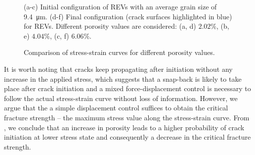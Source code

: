 \begin{figure}[!htb]
\begin{subfigure}{0.32\textwidth}
    \caption{}
    \label{b150_end}
  \end{subfigure}
  \caption{ (a-c) Initial configuration of REVs with an average grain size of \SI{9.4}{\micro\meter}. (d-f) Final configuration (crack surfaces highlighted in blue) for REVs. Different porosity values are considered: (a, d) $2.02\%$, (b, e) $4.04\%$, (c, f) $6.06\%$. }
  \label{ini_final_porosity}
\end{figure}

\begin{figure}[!htb]
  \centering
  \caption{Comparison of stress-strain curves for different porosity values.}
  \label{fig_porosity}
\end{figure}

It is worth noting that cracks keep propagating after initiation without any increase in the applied stress, which suggests that a snap-back is likely to take place after crack initiation and a mixed force-displacement control is necessary to follow the actual stress-strain curve without loss of information. However, we argue that the a simple displacement control suffices to obtain the critical fracture strength -- the maximum stress value along the stress-strain curve. From , we conclude that an increase in porosity leads to a higher probability of crack initiation at lower stress state and consequently a decrease in the critical fracture strength.

